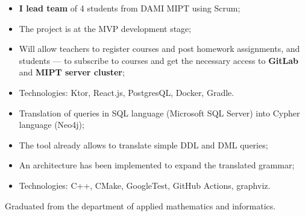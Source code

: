 \documentclass[10pt,a4paper,ragged2e,withhyper]{custom-altacv}
\begin{document}
\begin{paracol}{2}
\medskip




\begin{itemize}
	\item \textbf{I lead team} of 4 students from DAMI MIPT using Scrum;
	\item The project is at the MVP development stage;
	\item Will allow teachers to register courses and post homework assignments, and students --- to subscribe to courses and get the necessary access to \textbf{GitLab} and \textbf{MIPT server cluster};
	\item Technologies: Ktor, React.js, PostgresQL, Docker, Gradle.
\end{itemize}

\divider


\begin{itemize}
	\item Translation of queries in SQL language (Microsoft SQL Server) into Cypher language (Neo4j);
	\item The tool already allows to translate simple DDL and DML queries;
	\item An architecture has been implemented to expand the translated grammar;
	\item Technologies: C++, CMake, GoogleTest, GitHub Actions, graphviz.
\end{itemize}


\iffalse
\cvsection{Certificates and diplomas}

\cvachievement{\faGraduationCap}{Participations in two international olympiads on astronomy}{IOAA and IAO}
\fi



\switchcolumn


Graduated from the department of applied mathematics and informatics.




\end{paracol}
\end{document}
